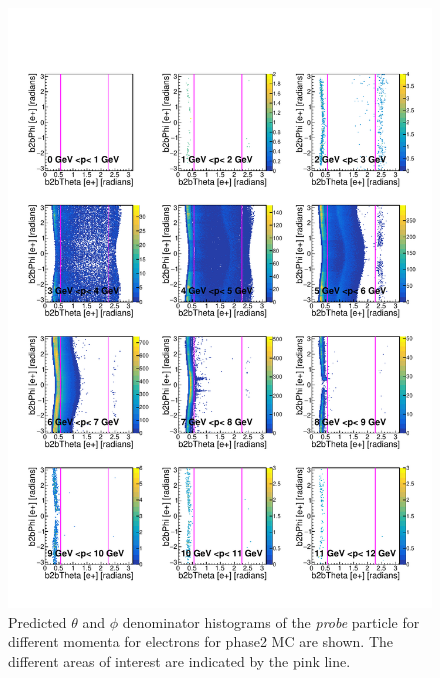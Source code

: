 \documentclass[a4paper,11pt,twosided,final,german,openbib,pdftex,listof=totoc,bibliography=totoc]{scrbook}
\begin{document}
\begin{appendix}
\begin{figure}[h!]
	\includegraphics[width=\textwidth]{Plots/RTPMemD_MC.pdf}
	\caption[Denominator $\theta$-$\phi$ Electron Momentum Phase2 MC]{Predicted $\theta$ and $\phi$ denominator histograms of the \textit{probe} particle for different momenta for electrons for phase2 MC are shown. The different areas of interest are indicated by the pink line.}
	\label{plt:RTPMemD_MC}
\end{figure}




\end{appendix}
\end{document}
